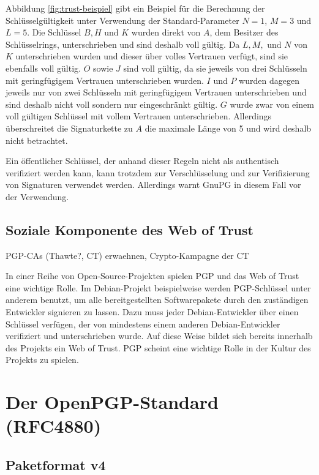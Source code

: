 Abbildung \ref{fig:trust-beispiel} gibt ein Beispiel für die
Berechnung der Schlüsselgültigkeit unter Verwendung der
Standard-Parameter $N=1$, $M=3$ und $L=5$. Die Schlüssel $B, H$ und
$K$ wurden direkt von $A$, dem Besitzer des Schlüsselrings,
unterschrieben und sind deshalb voll gültig. Da $L, M,$ und $N$ von
$K$ unterschrieben wurden und dieser über volles Vertrauen verfügt,
sind sie ebenfalls voll gültig. $O$ sowie $J$ sind voll gültig, da sie
jeweils von drei Schlüsseln mit geringfügigem Vertrauen unterschrieben
wurden. $I$ und $P$ wurden dagegen jeweils nur von zwei Schlüsseln mit
geringfügigem Vertrauen unterschrieben und sind deshalb nicht voll
sondern nur eingeschränkt gültig. $G$ wurde zwar von einem voll
gültigen Schlüssel mit vollem Vertrauen unterschrieben. Allerdings
überschreitet die Signaturkette zu $A$ die maximale Länge von 5 und
wird deshalb nicht betrachtet.

Ein öffentlicher Schlüssel, der anhand dieser Regeln nicht als
authentisch verifiziert werden kann, kann trotzdem zur Verschlüsselung
und zur Verifizierung von Signaturen verwendet werden. Allerdings
warnt GnuPG in diesem Fall vor der Verwendung.

\subsection{Soziale Komponente des Web of Trust}
\label{sec:sozi-komp-des}

PGP-CAs (Thawte?, CT) erwaehnen, Crypto-Kampagne der CT

In einer Reihe von Open-Source-Projekten spielen PGP und das Web of
Trust eine wichtige Rolle. Im Debian-Projekt beispielweise werden
PGP-Schl\"ussel unter anderem benutzt, um alle bereitgestellten
Softwarepakete durch den zust\"andigen Entwickler signieren zu
lassen. Dazu muss jeder Debian-Entwickler \"uber einen Schl\"ussel
verf\"ugen, der von mindestens einem anderen Debian-Entwickler
verifiziert und unterschrieben wurde. Auf diese Weise bildet sich
bereits innerhalb des Projekts ein Web of Trust. PGP scheint eine
wichtige Rolle in der Kultur des Projekts zu spielen. 



\section{Der OpenPGP-Standard (RFC4880)}
\label{ch:Grundlagen:sec:OpenPGP}

\subsection{Paketformat v4}
\label{ch:Grundlagen:sec:OpenPGP:subsec:PaketFormat}

